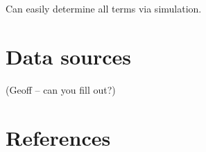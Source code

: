 \documentclass[authoryear]{elsarticle}
\begin{document}
Can easily determine all terms via simulation.


\section{Data sources}\label{data}

(Geoff -- can you fill out?)



\section*{References}

\end{document}
